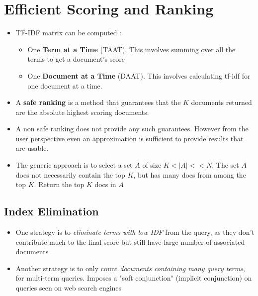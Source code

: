 \documentclass{article}
\begin{document}
\section{Efficient Scoring and Ranking}
\begin{itemize}
    \item TF-IDF matrix can be computed :
    \begin{itemize}
        \item One \textbf{Term at a Time} (TAAT). This involves summing over all the terms to get a document's score
        
        \item One \textbf{Document at a Time} (DAAT). This involves calculating tf-idf for one document at a time. 
    \end{itemize}
    
    \item A \textbf{safe ranking} is a method that guarantees that the $K$ documents returned are the absolute highest scoring documents. 
    
    \item A non safe ranking does not provide any such guarantees. However from the user perspective even an approximation is sufficient to provide results that are usable. 
    
    \item The generic approach is to select a set $A$ of size $K < |A| << N$. The set $A$ does not necessarily contain the top $K$, but has many docs from among the top $K$. Return the top $K$ docs in $A$
\end{itemize}
\subsection{Index Elimination}
\begin{itemize}
    \item One strategy is to \textit{eliminate terms with low IDF} from the query, as they don't contribute much to the final score but still have large number of associated documents 
    
    \item Another strategy is to only count \textit{documents containing many query terms}, for multi-term queries. Imposes a "soft conjunction" (implicit conjunction) on queries seen on web search engines
\end{itemize}
\end{document}
